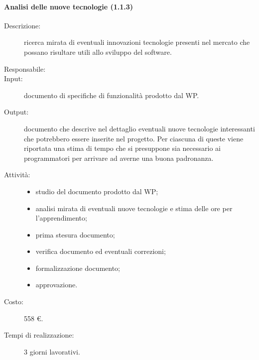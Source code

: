 \paragraph{Analisi delle nuove tecnologie (1.1.3)}
\begin{description}
\item[Descrizione:] ricerca mirata di eventuali innovazioni tecnologie presenti nel mercato che possano risultare utili allo sviluppo del software.
\item[Responsabile:]
\item[Input:] documento di specifiche di funzionalità prodotto dal WP.
\item[Output:] documento che descrive nel dettaglio eventuali nuove tecnologie interessanti che potrebbero essere inserite nel progetto. Per ciascuna di queste viene riportata una stima di tempo che si presuppone sia necessario ai programmatori per arrivare ad averne una buona padronanza.
\item[Attività:] 
\begin{center}
\begin{itemize}
\item studio del documento prodotto dal WP;
\item analisi mirata di eventuali nuove tecnologie e stima delle ore per l'apprendimento;
\item prima stesura documento;
\item verifica documento ed eventuali correzioni;
\item formalizzazione documento;
\item approvazione.
\end{itemize}
\end{center}
\item[Costo:] 558 \euro{}.
\item[Tempi di realizzazione:] 3 giorni lavorativi.
\end{description}


